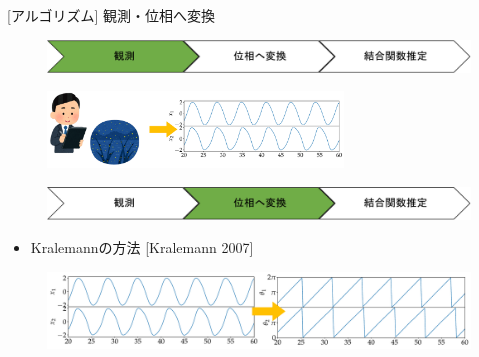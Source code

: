 \begin{frame}[t]{[アルゴリズム] 観測・位相へ変換}
\begin{figure}
  \centering
  \includegraphics[width=\textwidth]{figs/flowchart1.pdf}
\end{figure}
\begin{figure}
  \centering
  \includegraphics[width=0.7\textwidth]{figs/observe_ponchi.pdf}
\end{figure}
\begin{figure}
  \centering
  \includegraphics[width=\textwidth]{figs/flowchart2.pdf}
\end{figure}
\begin{itemize}
  \item Kralemannの方法 [Kralemann 2007]
\end{itemize}
\begin{figure}
  \centering
  \includegraphics[width=\textwidth]{figs/data_to_phase.pdf}
\end{figure}
\end{frame}



